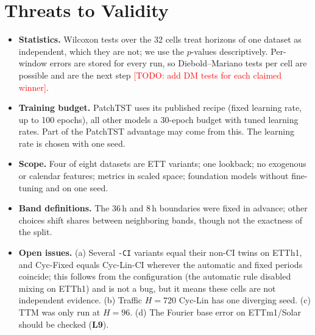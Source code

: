 \documentclass[11pt,a4paper]{article}
\newcommand{\lrn}[1]{\textbf{L#1}}
\newcommand{\todo}[1]{\textcolor{red}{[TODO: #1]}}
\begin{document}
\section{Threats to Validity}
\label{sec:threats}
\begin{itemize}
    \item \textbf{Statistics.} Wilcoxon tests over the 32 cells treat horizons of one dataset as independent, which they are not; we use the $p$-values descriptively. Per-window errors are stored for every run, so Diebold--Mariano tests per cell are possible and are the next step \todo{add DM tests for each claimed winner}.
    \item \textbf{Training budget.} PatchTST uses its published recipe (fixed learning rate, up to 100 epochs), all other models a 30-epoch budget with tuned learning rates. Part of the PatchTST advantage may come from this. The learning rate is chosen with one seed.
    \item \textbf{Scope.} Four of eight datasets are ETT variants; one lookback; no exogenous or calendar features; metrics in scaled space; foundation models without fine-tuning and on one seed.
    \item \textbf{Band definitions.} The 36\,h and 8\,h boundaries were fixed in advance; other choices shift shares between neighboring bands, though not the exactness of the split.
    \item \textbf{Open issues.} (a) Several \texttt{-CI} variants equal their non-CI twins on ETTh1, and Cyc-Fixed equals Cyc-Lin-CI wherever the automatic and fixed periods coincide; this follows from the configuration (the automatic rule disabled mixing on ETTh1) and is not a bug, but it means these cells are not independent evidence. (b) Traffic $H{=}720$ Cyc-Lin has one diverging seed. (c) TTM was only run at $H{=}96$. (d) The Fourier base error on ETTm1/Solar should be checked (\lrn{9}).
\end{itemize}
\end{document}
